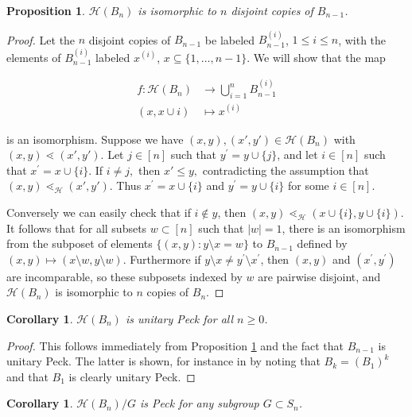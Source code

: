 \documentclass[10 pt]{amsart}
\theoremstyle{plain}
\newtheorem{prop}[thm]{Proposition}
\newtheorem{cor}[thm]{Corollary}
\theoremstyle{definition}
\theoremstyle{remark}
\numberwithin{equation}{section}
\begin{document}
\begin{prop}\label{prop:computing_HBn}
$\mathcal{H}(B_n)$ is isomorphic to $n$ disjoint copies of $B_{n-1}$.
\end{prop}

\begin{proof}
Let the $n$ disjoint copies of $B_{n-1}$ be labeled $B_{n-1}^{(i)}$, $1\le i\le n$, with the elements of $B_{n-1}^{(i)}$ labeled $x^{(i)}$, $x\subseteq \{1,\ldots,n-1\}$.  We will show that the map 

\begin{align*}
f\colon \mathcal{H}(B_n) &\longrightarrow \bigcup_{i=1}^n B_{n-1}^{(i)}\\
(x,x\cup{i})&\longmapsto x^{(i)}
\end{align*}

\noindent is an isomorphism.  Suppose we have $(x, y),(x', y') \in \mathcal H(B_n)$ with $(x, y) \lessdot (x', y').$ Let $j\in [n]$ such that $y^\prime = y\cup\{j\}$, and let $i\in [n]$ such that $x^\prime = x\cup \{i\}$. If $i \ne j,$ then $x' \leq y,$ contradicting the assumption that $(x, y) \lessdot_{\mathcal H} (x', y').$ Thus $x^\prime = x\cup\{i\}$ and $y^\prime = y\cup\{i\}$ for some $i\in [n]$.

Conversely we can easily check that if $i\not\in y$, then $(x, y)\lessdot_{\mathcal{H}} (x\cup\{i\}, y\cup\{i\})$.  It follows that for all subsets $w \subset [n]$ such that $|w| = 1$, there is an isomorphism from the subposet of elements $\{(x, y)\colon y\setminus x = w\}$ to $B_{n-1}$ defined by $(x,y)\mapsto (x\setminus w,y\setminus w)$.  Furthermore if $y\setminus x \ne y^\prime \setminus x^\prime$, then $(x, y)$ and $(x^\prime, y^\prime)$ are incomparable, so these subposets indexed by $w$ are pairwise disjoint, and $\mathcal H(B_n)$ is isomorphic to $n$ copies of $B_{n}$.
\end{proof}

\begin{cor}\label{cor:HBn_unitary_peck}
$\mathcal H(B_n)$ is unitary Peck for all $n\ge 0$.
\end{cor}

\begin{proof}
This follows immediately from Proposition \ref{prop:computing_HBn} and the fact that $B_{n-1}$ is unitary Peck.  The latter is shown, for instance in \cite[Theorem 2a]{quotients_stanley} by noting that $B_k = (B_1)^k$ and that $B_1$ is clearly unitary Peck.
\end{proof}

\begin{cor}\label{cor:quotients_of_HBn_peck}
$\mathcal H(B_n)/G$ is Peck for any subgroup $G\subset S_n$.
\end{cor}
\end{document}
